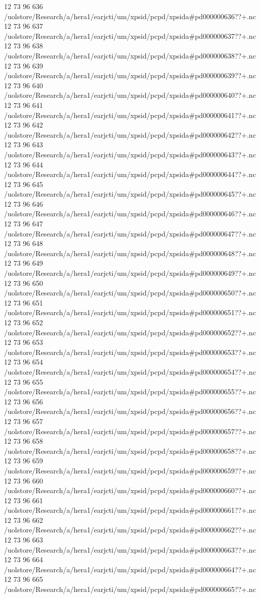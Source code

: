 12 73 96
636
/uolstore/Research/a/hera1/earjcti/um/xpsid/pcpd/xpsida#pd000000636??+.nc
12 73 96
637
/uolstore/Research/a/hera1/earjcti/um/xpsid/pcpd/xpsida#pd000000637??+.nc
12 73 96
638
/uolstore/Research/a/hera1/earjcti/um/xpsid/pcpd/xpsida#pd000000638??+.nc
12 73 96
639
/uolstore/Research/a/hera1/earjcti/um/xpsid/pcpd/xpsida#pd000000639??+.nc
12 73 96
640
/uolstore/Research/a/hera1/earjcti/um/xpsid/pcpd/xpsida#pd000000640??+.nc
12 73 96
641
/uolstore/Research/a/hera1/earjcti/um/xpsid/pcpd/xpsida#pd000000641??+.nc
12 73 96
642
/uolstore/Research/a/hera1/earjcti/um/xpsid/pcpd/xpsida#pd000000642??+.nc
12 73 96
643
/uolstore/Research/a/hera1/earjcti/um/xpsid/pcpd/xpsida#pd000000643??+.nc
12 73 96
644
/uolstore/Research/a/hera1/earjcti/um/xpsid/pcpd/xpsida#pd000000644??+.nc
12 73 96
645
/uolstore/Research/a/hera1/earjcti/um/xpsid/pcpd/xpsida#pd000000645??+.nc
12 73 96
646
/uolstore/Research/a/hera1/earjcti/um/xpsid/pcpd/xpsida#pd000000646??+.nc
12 73 96
647
/uolstore/Research/a/hera1/earjcti/um/xpsid/pcpd/xpsida#pd000000647??+.nc
12 73 96
648
/uolstore/Research/a/hera1/earjcti/um/xpsid/pcpd/xpsida#pd000000648??+.nc
12 73 96
649
/uolstore/Research/a/hera1/earjcti/um/xpsid/pcpd/xpsida#pd000000649??+.nc
12 73 96
650
/uolstore/Research/a/hera1/earjcti/um/xpsid/pcpd/xpsida#pd000000650??+.nc
12 73 96
651
/uolstore/Research/a/hera1/earjcti/um/xpsid/pcpd/xpsida#pd000000651??+.nc
12 73 96
652
/uolstore/Research/a/hera1/earjcti/um/xpsid/pcpd/xpsida#pd000000652??+.nc
12 73 96
653
/uolstore/Research/a/hera1/earjcti/um/xpsid/pcpd/xpsida#pd000000653??+.nc
12 73 96
654
/uolstore/Research/a/hera1/earjcti/um/xpsid/pcpd/xpsida#pd000000654??+.nc
12 73 96
655
/uolstore/Research/a/hera1/earjcti/um/xpsid/pcpd/xpsida#pd000000655??+.nc
12 73 96
656
/uolstore/Research/a/hera1/earjcti/um/xpsid/pcpd/xpsida#pd000000656??+.nc
12 73 96
657
/uolstore/Research/a/hera1/earjcti/um/xpsid/pcpd/xpsida#pd000000657??+.nc
12 73 96
658
/uolstore/Research/a/hera1/earjcti/um/xpsid/pcpd/xpsida#pd000000658??+.nc
12 73 96
659
/uolstore/Research/a/hera1/earjcti/um/xpsid/pcpd/xpsida#pd000000659??+.nc
12 73 96
660
/uolstore/Research/a/hera1/earjcti/um/xpsid/pcpd/xpsida#pd000000660??+.nc
12 73 96
661
/uolstore/Research/a/hera1/earjcti/um/xpsid/pcpd/xpsida#pd000000661??+.nc
12 73 96
662
/uolstore/Research/a/hera1/earjcti/um/xpsid/pcpd/xpsida#pd000000662??+.nc
12 73 96
663
/uolstore/Research/a/hera1/earjcti/um/xpsid/pcpd/xpsida#pd000000663??+.nc
12 73 96
664
/uolstore/Research/a/hera1/earjcti/um/xpsid/pcpd/xpsida#pd000000664??+.nc
12 73 96
665
/uolstore/Research/a/hera1/earjcti/um/xpsid/pcpd/xpsida#pd000000665??+.nc
